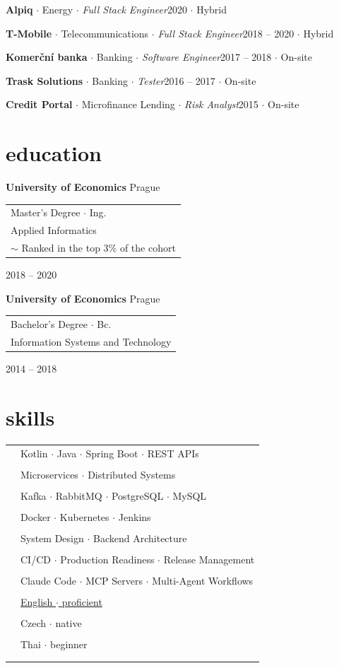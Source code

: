 \documentclass[10pt]{article}
\newcommand{\entry}[4]{{{\textbf{#1}}} \hfill #3 \\
#2 \hfill #4}
\newcommand{\tableentry}[3]{%
  \textsc{#1} & #2\ifx\relax#3\relax\\[0pt]\else\\[3pt]\fi%
}
\newcommand{\minifiedentry}[5]{%
  {\footnotesize\textbf{#1} $\cdot$ #2 $\cdot$ \textit{#3}\hfill #4 $\cdot$ #5}\par%
}
\begin{document}
\begin{paracol}{2}
\smallskip

\minifiedentry{Alpiq}{Energy}{Full Stack Engineer}{2020}{Hybrid}

\smallskip

\minifiedentry{T-Mobile}{Telecommunications}{Full Stack Engineer}{2018 -- 2020}{Hybrid}

\smallskip

\minifiedentry{Komerční banka}{Banking}{Software Engineer}{2017 -- 2018}{On-site}

\smallskip

\minifiedentry{Trask Solutions}{Banking}{Tester}{2016 -- 2017}{On-site}

\smallskip

\minifiedentry{Credit Portal}{Microfinance Lending}{Risk Analyst}{2015}{On-site}


\switchcolumn

\section{education}

\entry
{University of Economics}
{\begin{tabular}[t]{@{}l@{}}
Master's Degree $\cdot$ Ing. \\
Applied Informatics \\
$\sim$ Ranked in the top 3\% of the cohort
\end{tabular}}
{Prague}
{2018 -- 2020}

\smallskip

\entry
{University of Economics}
{\begin{tabular}[t]{@{}l@{}}
Bachelor's Degree $\cdot$ Bc. \\
Information Systems and Technology
\end{tabular}}
{Prague}
{2014 -- 2018}

\smallskip

\section{skills}

\begin{supertabular}{rl}
  \tableentry{\footnotesize\faCode}{Kotlin $\cdot$ Java $\cdot$ Spring Boot $\cdot$ REST APIs}{}
  \tableentry{}{Microservices $\cdot$ Distributed Systems}{}
  \tableentry{}{Kafka $\cdot$ RabbitMQ $\cdot$ PostgreSQL $\cdot$ MySQL}{}
  \tableentry{}{Docker $\cdot$ Kubernetes $\cdot$ Jenkins}{}
  \tableentry{}{System Design $\cdot$ Backend Architecture}{}
  \tableentry{}{CI/CD $\cdot$ Production Readiness $\cdot$ Release Management}{}
  \tableentry{}{Claude Code $\cdot$ MCP Servers $\cdot$ Multi-Agent Workflows}{}
  \tableentry{\footnotesize\faLanguage}{\href{https://cert.efset.org/en/YDeoGQ}{English $\cdot$ proficient}}{}
  \tableentry{}{Czech $\cdot$ native}{}
  \tableentry{}{Thai $\cdot$ beginner}{}
\end{supertabular}


\end{paracol}
\end{document}
